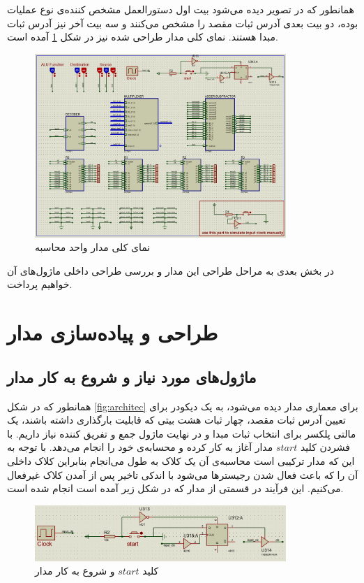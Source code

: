\documentclass[12pt,onecolumn,a4paper,fleqn]{article}
\begin{document}
	همانطور که در تصویر دیده می‌شود بیت اول دستورالعمل مشخص کننده‌ی نوع عملیات بوده، دو بیت بعدی آدرس ثبات مقصد را مشخص می‌کنند و سه بیت آخر نیز آدرس ثبات مبدا هستند. نمای کلی مدار طراحی شده نیز در شکل \ref{fig:circuit} آمده است.
	\begin{figure}[H]
		\centering
		\includegraphics[width=0.85\textwidth]{source/circuit.png}
		\caption{نمای کلی مدار واحد محاسبه}
		\label{fig:circuit}
	\end{figure}
	در بخش بعدی به مراحل طراحی این مدار و بررسی طراحی داخلی ماژول‌های آن خواهیم پرداخت.
	\pagebreak
	\section{طراحی و پیاده‌سازی مدار}
	\subsection*{ماژول‌های مورد نیاز و شروع به کار مدار}
	همانطور که در شکل \ref{fig:architec} برای معماری مدار دیده می‌شود، به یک دیکودر برای تعیین آدرس ثبات مقصد، چهار ثبات هشت بیتی که قابلیت بارگذاری داشته باشند، یک مالتی پلکسر برای انتخاب ثبات مبدا و در نهایت ماژول جمع و تفریق کننده نیاز داریم. با فشردن کلید $start$ مدار آغاز به کار کرده و محسابه‌ی خود را انجام می‌دهد. با توجه به این که مدار ترکیبی است محاسبه‌ی آن یک کلاک به طول می‌انجام بنابراین کلاک داخلی آن را که باعث فعال شدن رجیسترها می‌شود با اندکی تاخیر پس از آمدن کلاک غیرفعال می‌کنیم. این فرآیند در قسمتی از مدار که در شکل زیر آمده است انجام شده است.
	\begin{figure}[H]
		\centering
		\includegraphics[width=0.85\textwidth]{source/start.png}
		\caption{کلید $start$ و شروع به کار مدار}
		\label{fig:start}
	\end{figure}
\end{document}
